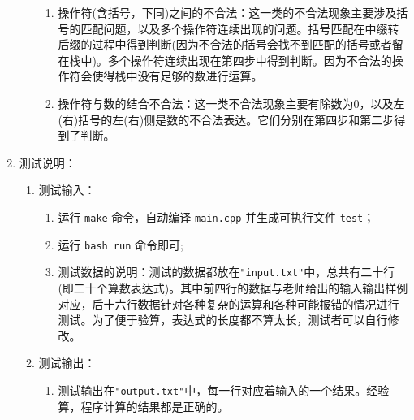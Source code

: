 \documentclass[a4paper,12pt]{article}
\begin{document}
\begin{enumerate}
\begin{enumerate}
\begin{enumerate}
        \item 操作符(含括号，下同)之间的不合法：这一类的不合法现象主要涉及括号的匹配问题，以及多个操作符连续出现的问题。括号匹配在中缀转后缀的过程中得到判断(因为不合法的括号会找不到匹配的括号或者留在栈中)。多个操作符连续出现在第四步中得到判断。因为不合法的操作符会使得栈中没有足够的数进行运算。
        \item 操作符与数的结合不合法：这一类不合法现象主要有除数为0，以及左(右)括号的左(右)侧是数的不合法表达。它们分别在第四步和第二步得到了判断。
    \end{enumerate}
\end{enumerate}
\item 测试说明：
\begin{enumerate}
    \item 测试输入：
    \begin{enumerate}
        \item 运行 \verb|make| 命令，自动编译 \verb|main.cpp| 并生成可执行文件 \verb|test|；
        \item 运行 \verb|bash run| 命令即可;
        \item {\hei 测试数据的说明}：测试的数据都放在\verb|"input.txt"|中，总共有二十行(即二十个算数表达式)。其中前四行的数据与老师给出的输入输出样例对应，后十六行数据针对各种复杂的运算和各种可能报错的情况进行测试。{\hei 为了便于验算，表达式的长度都不算太长，测试者可以自行修改。}
    \end{enumerate}
    \item 测试输出：
        \begin{enumerate}
        \item 测试输出在\verb|"output.txt"|中，每一行对应着输入的一个结果。经验算，程序计算的结果都是正确的。
    \end{enumerate}
\end{enumerate}

\end{enumerate}



\end{document}
